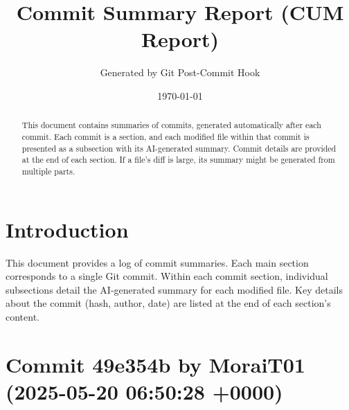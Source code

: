 \documentclass{article}
\title{Commit Summary Report (CUM Report)}
\author{Generated by Git Post-Commit Hook}
\date{\today}
\begin{document}
\maketitle
\begin{abstract}
This document contains summaries of commits, generated automatically after each commit. Each commit is a section, and each modified file within that commit is presented as a subsection with its AI-generated summary. Commit details are provided at the end of each section. If a file's diff is large, its summary might be generated from multiple parts.
\end{abstract}
\tableofcontents
\newpage

\section{Introduction}
This document provides a log of commit summaries. Each main section corresponds to a single Git commit. Within each commit section, individual subsections detail the AI-generated summary for each modified file. Key details about the commit (hash, author, date) are listed at the end of each section's content.
\section{Commit 49e354b by MoraiT01 (2025-05-20 06:50:28 +0000)}
\end{document}
